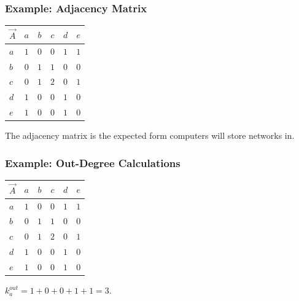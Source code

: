 \documentclass{beamer}
\newcommand{\ds}{\displaystyle}
\begin{document}
\begin{frame}

    \frametitle{Example: Adjacency Matrix}

    \begin{center}
        \begin{tabular}{l | c c c c c}
            $ \vec{A} $ & $ a $ & $ b $ & $ c $ & $ d $ & $ e $ \\
            \hline
            $ a $ & $ 1 $ & $ 0 $ & $ 0 $ & $ 1 $ & $ 1 $ \\
            $ b $ & $ 0 $ & $ 1 $ & $ 1 $ & $ 0 $ & $ 0 $ \\
            $ c $ & $ 0 $ & $ 1 $ & $ 2 $ & $ 0 $ & $ 1 $ \\
            $ d $ & $ 1 $ & $ 0 $ & $ 0 $ & $ 1 $ & $ 0 $ \\
            $ e $ & $ 1 $ & $ 0 $ & $ 0 $ & $ 1 $ & $ 0 $ \\
        \end{tabular}
    \end{center}\pause

    \vspace{2.5mm}
    The adjacency matrix is the expected form computers will store networks in.

\end{frame}

\begin{frame}

    \frametitle{Example: Out-Degree Calculations}

    \begin{center}
        \begin{tabular}{l | c c c c c}
            $ \vec{A} $ & $ a $ & $ b $ & $ c $ & $ d $ & $ e $ \\
            \hline
            \rowcolor{ummaize}
            $ a $ & $ 1 $ & $ 0 $ & $ 0 $ & $ 1 $ & $ 1 $ \\
            $ b $ & $ 0 $ & $ 1 $ & $ 1 $ & $ 0 $ & $ 0 $ \\
            $ c $ & $ 0 $ & $ 1 $ & $ 2 $ & $ 0 $ & $ 1 $ \\
            $ d $ & $ 1 $ & $ 0 $ & $ 0 $ & $ 1 $ & $ 0 $ \\
            $ e $ & $ 1 $ & $ 0 $ & $ 0 $ & $ 1 $ & $ 0 $ \\
        \end{tabular}
    \end{center}\pause

    \vspace{2.5mm}
    $ \ds k_{a}^{out} = 1 + 0 + 0 + 1 + 1 = 3 $.

\end{frame}
\end{document}
